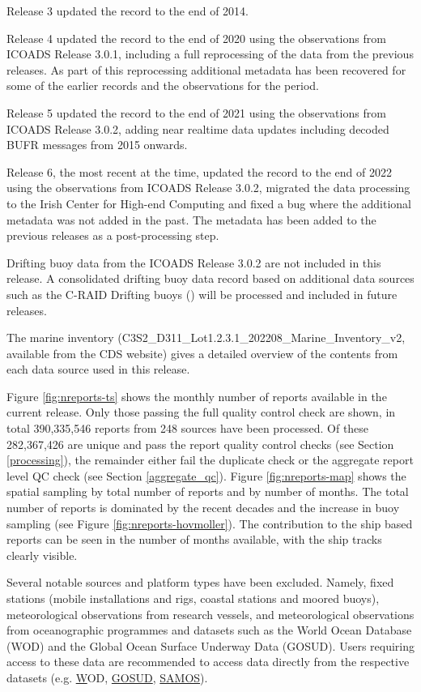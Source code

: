 Release 3 updated the record to the end of 2014. 

Release 4 updated the record to the end of 2020 using the observations from ICOADS Release 3.0.1, including a full reprocessing of the data from the previous releases. As part of this reprocessing additional metadata has been recovered for some of the earlier records and the observations for the period.

Release 5 updated the record to the end of 2021 using the observations from ICOADS Release 3.0.2, adding near realtime data updates including decoded BUFR messages from 2015 onwards.

Release 6, the most recent at the time, updated the record to the end of 2022 using the observations from ICOADS Release 3.0.2, migrated the data processing to the Irish Center for High-end Computing and fixed a bug where the additional metadata was not added in the past. The metadata has been added to the previous releases as a post-processing step.

Drifting buoy data from the ICOADS Release 3.0.2 are not included in this release.
A consolidated drifting buoy data record based on additional data sources such as the C-RAID Drifting buoys (\cite{craid}) will be processed and included in future releases.

The marine inventory (C3S2\_D311\_Lot1.2.3.1\_202208\_Marine\_Inventory\_v2, available from the CDS website) gives a detailed overview of the contents from each data source used in this release.

Figure \ref{fig:nreports-ts} shows the monthly number of reports available in the current release. 
Only those passing the full quality control check are shown, in total 390,335,546 reports from 248 sources have been processed.
Of these 282,367,426 are unique and pass the report quality control checks (see Section \ref{processing}), the remainder either fail the duplicate check or the aggregate report level QC check (see Section \ref{aggregate_qc}).
Figure \ref{fig:nreports-map} shows the spatial sampling by total number of reports and by number of months. 
The total number of reports is dominated by the recent decades and the increase in buoy sampling (see Figure \ref{fig:nreports-hovmoller}). 
The contribution to the ship based reports can be seen in the number of months available, with the ship tracks clearly visible.

Several notable sources and platform types have been excluded.
Namely, fixed stations (mobile installations and rigs, coastal stations and moored buoys), meteorological observations from research vessels, and meteorological observations from oceanographic programmes and datasets such as the World Ocean Database (WOD) and the Global Ocean Surface Underway Data (GOSUD). 
Users requiring access to these data are recommended to access data directly from the respective datasets (e.g. \href{https://www.ncei.noaa.gov/access/world-ocean-database-select/dbsearch.html} WOD, \href{http://www.gosud.org/}{GOSUD}, \href{https://samos.coaps.fsu.edu/html/nav.php?s=2}{SAMOS}).

